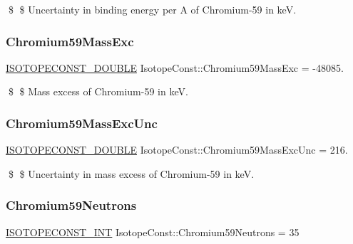 \$ \$ Uncertainty in binding energy per A of Chromium-\/59 in keV. \mbox{\label{group___isotope_const-_chromium-_cr59_gac7b4b99c554ee4ca78f9aee14f4b976a}} 
\subsubsection{\texorpdfstring{Chromium59\+Mass\+Exc}{Chromium59MassExc}}
{\footnotesize\ttfamily \mbox{\hyperlink{group___isotope_const-_macros_ga8f45a7272ce02c0b4c65c44636ed719a}{I\+S\+O\+T\+O\+P\+E\+C\+O\+N\+S\+T\+\_\+\+D\+O\+U\+B\+LE}} Isotope\+Const\+::\+Chromium59\+Mass\+Exc = -\/48085.}

\$ \$ Mass excess of Chromium-\/59 in keV. \mbox{\label{group___isotope_const-_chromium-_cr59_gab442897750c85e107fb6342967b6665a}} 
\subsubsection{\texorpdfstring{Chromium59\+Mass\+Exc\+Unc}{Chromium59MassExcUnc}}
{\footnotesize\ttfamily \mbox{\hyperlink{group___isotope_const-_macros_ga8f45a7272ce02c0b4c65c44636ed719a}{I\+S\+O\+T\+O\+P\+E\+C\+O\+N\+S\+T\+\_\+\+D\+O\+U\+B\+LE}} Isotope\+Const\+::\+Chromium59\+Mass\+Exc\+Unc = 216.}

\$ \$ Uncertainty in mass excess of Chromium-\/59 in keV. \mbox{\label{group___isotope_const-_chromium-_cr59_gacd811f4d50abaa65c3ed46d4f5d05fd3}} 
\subsubsection{\texorpdfstring{Chromium59\+Neutrons}{Chromium59Neutrons}}
{\footnotesize\ttfamily \mbox{\hyperlink{group___isotope_const-_macros_ga5f18360b3e99483a35c32d789e62621c}{I\+S\+O\+T\+O\+P\+E\+C\+O\+N\+S\+T\+\_\+\+I\+NT}} Isotope\+Const\+::\+Chromium59\+Neutrons = 35}

